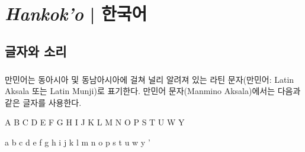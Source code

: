 \documentclass{book}
\begin{document}
\chapter{\textit{Hankok'o} | 한국어}\normalsize{}
    \section{글자와 소리}
    \paragraph{}
    만민어는 동아시아 및 동남아시아에 걸쳐 널리 알려져 있는 라틴 문자(만민어: Latin Aksala 또는 Latin Munji)로 표기한다. 만민어 문자(Manmino Aksala)에서는 다음과 같은 글자를 사용한다.
    \begin{center}
    A B C D E F G H I J K L M N O P S T U W Y 
    
    a b c d e f g h i j k l m n o p s t u w y '
    \end{center}
\end{document}
